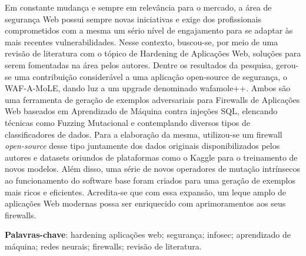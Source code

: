 \begin{resumo}
\begin{SingleSpace}
Em constante mudança e sempre em relevância para o mercado, a área de segurança Web possui sempre novas iniciativas e exige dos profissionais comprometidos com a mesma um sério nível de engajamento para se adaptar às mais recentes vulnerabilidades. Nesse contexto, buscou-se, por meio de uma revisão de literatura com o tópico de Hardening de Aplicações Web, soluções para serem fomentadas na área pelos autores. Dentre os resultados da pesquisa, gerou-se uma contribuição considerável a uma aplicação open-source de segurança, o WAF-A-MoLE, dando luz a um upgrade denominado wafamole++. Ambos são uma ferramenta de geração de exemplos adversariais para Firewalls de Aplicações Web baseados em Aprendizado de Máquina contra injeções SQL, elencando técnicas como Fuzzing Mutacional e contemplando diversos tipos de classificadores de dados. Para a elaboração da mesma, utilizou-se um firewall \textit{open-source} desse tipo juntamente dos dados originais disponibilizados pelos autores e datasets oriundos de plataformas como o Kaggle para o treinamento de novos modelos. Além disso, uma série de novos operadores de mutação intrínsecos ao funcionamento do software base foram criados para uma geração de exemplos mais ricos e eficientes. Acredita-se que com essa expansão, um leque amplo de aplicações Web modernas possa ser enriquecido com aprimoramentos aos seus firewalls.
\end{SingleSpace}
\vspace{\onelineskip}
\textbf{Palavras-chave}: hardening aplicações web; segurança; infosec; aprendizado de máquina; redes neurais; firewalls; revisão de literatura.

\end{resumo}



